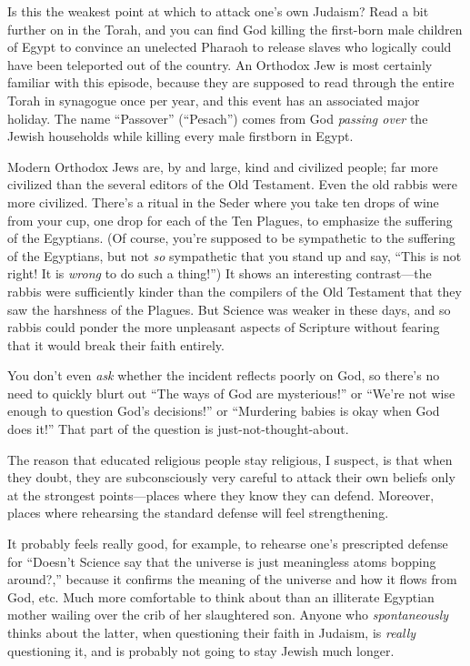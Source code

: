 {
 Is this the weakest point at which to attack one's
own Judaism? Read a bit further on in the Torah, and you can find God
killing the first-born male children of Egypt to convince an unelected
Pharaoh to release slaves who logically could have been teleported out
of the country. An Orthodox Jew is most certainly familiar with this
episode, because they are supposed to read through the entire Torah in
synagogue once per year, and this event has an associated major
holiday. The name ``Passover''
(``Pesach'') comes from God
\textit{passing over} the Jewish households while killing every male
firstborn in Egypt.}

{
 Modern Orthodox Jews are, by and large, kind and civilized people;
far more civilized than the several editors of the Old Testament. Even
the old rabbis were more civilized. There's a ritual in
the Seder where you take ten drops of wine from your cup, one drop for
each of the Ten Plagues, to emphasize the suffering of the Egyptians.
(Of course, you're supposed to be sympathetic to the
suffering of the Egyptians, but not \textit{so} sympathetic that you
stand up and say, ``This is not right! It is
\textit{wrong} to do such a thing!'') It shows an
interesting contrast---the rabbis were sufficiently kinder than the
compilers of the Old Testament that they saw the harshness of the
Plagues. But Science was weaker in these days, and so rabbis could
ponder the more unpleasant aspects of Scripture without fearing that it
would break their faith entirely.}

{
 You don't even \textit{ask} whether the incident
reflects poorly on God, so there's no need to quickly
blurt out ``The ways of God are
mysterious!'' or
``We're not wise enough to question
God's decisions!'' or
``Murdering babies is okay when God does
it!'' That part of the question is
just-not-thought-about.}

{
 The reason that educated religious people stay religious, I
suspect, is that when they doubt, they are subconsciously very careful
to attack their own beliefs only at the strongest points---places where
they know they can defend. Moreover, places where rehearsing the
standard defense will feel strengthening.}

{
 It probably feels really good, for example, to rehearse
one's prescripted defense for
``Doesn't Science say that the
universe is just meaningless atoms bopping around?,''
because it confirms the meaning of the universe and how it flows from
God, etc. Much more comfortable to think about than an illiterate
Egyptian mother wailing over the crib of her slaughtered son. Anyone
who \textit{spontaneously} thinks about the latter, when questioning
their faith in Judaism, is \textit{really} questioning it, and is
probably not going to stay Jewish much longer.}

